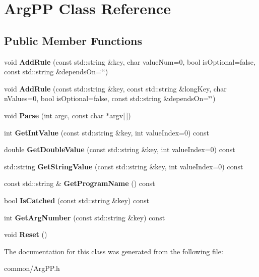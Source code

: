 \hypertarget{class_arg_p_p}{}\section{Arg\+PP Class Reference}
\label{class_arg_p_p}
\subsection*{Public Member Functions}
\begin{DoxyCompactItemize}
\item 
\mbox{\label{class_arg_p_p_a07bf0e318615242cab5c76b5214aefc5}} 
void {\bfseries Add\+Rule} (const std\+::string \&key, char value\+Num=0, bool is\+Optional=false, const std\+::string \&depends\+On=\char`\"{}\char`\"{})
\item 
\mbox{\label{class_arg_p_p_ab422fc487262b622c7e1bdf054a550c9}} 
void {\bfseries Add\+Rule} (const std\+::string \&key, const std\+::string \&long\+Key, char n\+Values=0, bool is\+Optional=false, const std\+::string \&depends\+On=\char`\"{}\char`\"{})
\item 
\mbox{\label{class_arg_p_p_a21c2ce9ad8c91584308a6238abd88a17}} 
void {\bfseries Parse} (int argc, const char $\ast$argv\mbox{[}$\,$\mbox{]})
\item 
\mbox{\label{class_arg_p_p_a7a0613b34955e9010c8da190cf362b17}} 
int {\bfseries Get\+Int\+Value} (const std\+::string \&key, int value\+Index=0) const
\item 
\mbox{\label{class_arg_p_p_abff89279dd723fd7092d337231ae5650}} 
double {\bfseries Get\+Double\+Value} (const std\+::string \&key, int value\+Index=0) const
\item 
\mbox{\label{class_arg_p_p_ab9432cb9674cc0d1af76dc9939b2d396}} 
std\+::string {\bfseries Get\+String\+Value} (const std\+::string \&key, int value\+Index=0) const
\item 
\mbox{\label{class_arg_p_p_a17af0d6f1d76e3891b7031b29e561245}} 
const std\+::string \& {\bfseries Get\+Program\+Name} () const
\item 
\mbox{\label{class_arg_p_p_ab0fd124560b8fde96a4ed0f554a858ac}} 
bool {\bfseries Is\+Catched} (const std\+::string \&key) const
\item 
\mbox{\label{class_arg_p_p_a0f57b414de10dd09d8c1307ebdea9d8e}} 
int {\bfseries Get\+Arg\+Number} (const std\+::string \&key) const
\item 
\mbox{\label{class_arg_p_p_a8273eaa8c1a773f2fd57b1a30ed07a7f}} 
void {\bfseries Reset} ()
\end{DoxyCompactItemize}


The documentation for this class was generated from the following file\+:\begin{DoxyCompactItemize}
\item 
common/Arg\+P\+P.\+h\end{DoxyCompactItemize}
